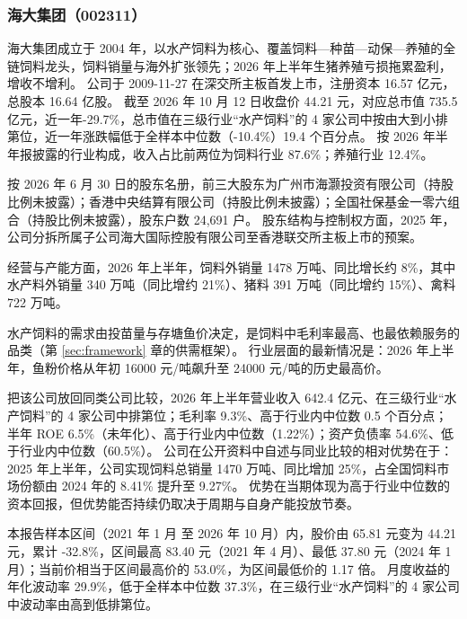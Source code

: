 
\subsubsection{海大集团（002311）}
\label{co:002311}

 海大集团成立于 2004 年，以水产饲料为核心、覆盖饲料—种苗—动保—养殖的全链饲料龙头，饲料销量与海外扩张领先；2026 年上半年生猪养殖亏损拖累盈利，增收不增利。 公司于 2009-11-27 在深交所主板首发上市，注册资本 16.57 亿元，总股本 16.64 亿股。 截至 2026 年 10 月 12 日收盘价 44.21 元，对应总市值 735.5 亿元，近一年-29.7\%，总市值在三级行业“水产饲料”的 4 家公司中按由大到小排第位，近一年涨跌幅低于全样本中位数（-10.4\%）19.4 个百分点。 按 2026 年半年报披露的行业构成，收入占比前两位为饲料行业 87.6\%；养殖行业 12.4\%。

 按 2026 年 6 月 30 日的股东名册，前三大股东为广州市海灏投资有限公司（持股比例未披露）；香港中央结算有限公司（持股比例未披露）；全国社保基金一零六组合（持股比例未披露），股东户数 24,691 户。 股东结构与控制权方面，2025 年，公司分拆所属子公司海大国际控股有限公司至香港联交所主板上市的预案。

 经营与产能方面，2026 年上半年，饲料外销量 1478 万吨、同比增长约 8\%，其中水产料外销量 340 万吨（同比增约 21\%）、猪料 391 万吨（同比增约 15\%）、禽料 722 万吨。

 水产饲料的需求由投苗量与存塘鱼价决定，是饲料中毛利率最高、也最依赖服务的品类（第 \ref{sec:framework} 章的供需框架）。 行业层面的最新情况是：2026 年上半年，鱼粉价格从年初 16000 元/吨飙升至 24000 元/吨的历史最高价。

 把该公司放回同类公司比较，2026 年上半年营业收入 642.4 亿元、在三级行业“水产饲料”的 4 家公司中排第位；毛利率 9.3\%、高于行业内中位数 0.5 个百分点；半年 ROE 6.5\%（未年化）、高于行业内中位数（1.22\%）；资产负债率 54.6\%、低于行业内中位数（60.5\%）。 公司在公开资料中自述与同业比较的相对优势在于：2025 年上半年，公司实现饲料总销量 1470 万吨、同比增加 25\%，占全国饲料市场份额由 2024 年的 8.41\% 提升至 9.27\%。 优势在当期体现为高于行业中位数的资本回报，但优势能否持续仍取决于周期与自身产能投放节奏。

 本报告样本区间（2021 年 1 月 至 2026 年 10 月）内，股价由 65.81 元变为 44.21 元，累计 -32.8\%，区间最高 83.40 元（2021 年 4 月）、最低 37.80 元（2024 年 1 月）；当前价相当于区间最高价的 53.0\%，为区间最低价的 1.17 倍。 月度收益的年化波动率 29.9\%，低于全样本中位数 37.3\%，在三级行业“水产饲料”的 4 家公司中波动率由高到低排第位。

